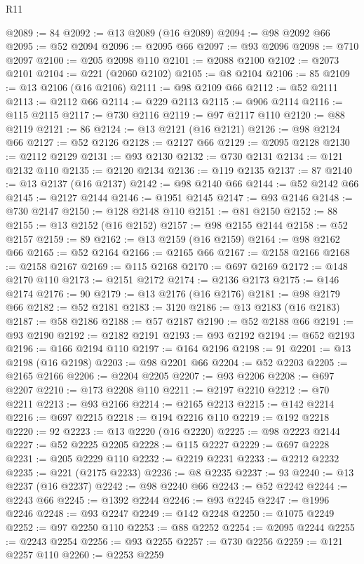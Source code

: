\begin{lexlean}{R11}
\begin{coremodule}
@2089 := 84
@2092 := @13 @2089 (@16 @2089)
@2094 := @98 @2092 @66
@2095 := @52 @2094
@2096 := @2095 @66
@2097 := @93 @2096
@2098 := @710 @2097
@2100 := @205 @2098 @110
@2101 := @2088 @2100
@2102 := @2073 @2101
@2104 := @221 (@2060 @2102)
@2105 := @8 @2104
@2106 := 85
@2109 := @13 @2106 (@16 @2106)
@2111 := @98 @2109 @66
@2112 := @52 @2111
@2113 := @2112 @66
@2114 := @229 @2113
@2115 := @906 @2114
@2116 := @115 @2115
@2117 := @730 @2116
@2119 := @97 @2117 @110
@2120 := @88 @2119
@2121 := 86
@2124 := @13 @2121 (@16 @2121)
@2126 := @98 @2124 @66
@2127 := @52 @2126
@2128 := @2127 @66
@2129 := @2095 @2128
@2130 := @2112 @2129
@2131 := @93 @2130
@2132 := @730 @2131
@2134 := @121 @2132 @110
@2135 := @2120 @2134
@2136 := @119 @2135
@2137 := 87
@2140 := @13 @2137 (@16 @2137)
@2142 := @98 @2140 @66
@2144 := @52 @2142 @66
@2145 := @2127 @2144
@2146 := @1951 @2145
@2147 := @93 @2146
@2148 := @730 @2147
@2150 := @128 @2148 @110
@2151 := @81 @2150
@2152 := 88
@2155 := @13 @2152 (@16 @2152)
@2157 := @98 @2155 @2144
@2158 := @52 @2157
@2159 := 89
@2162 := @13 @2159 (@16 @2159)
@2164 := @98 @2162 @66
@2165 := @52 @2164
@2166 := @2165 @66
@2167 := @2158 @2166
@2168 := @2158 @2167
@2169 := @115 @2168
@2170 := @697 @2169
@2172 := @148 @2170 @110
@2173 := @2151 @2172
@2174 := @2136 @2173
@2175 := @146 @2174
@2176 := 90
@2179 := @13 @2176 (@16 @2176)
@2181 := @98 @2179 @66
@2182 := @52 @2181
@2183 := 3120
@2186 := @13 @2183 (@16 @2183)
@2187 := @58 @2186
@2188 := @57 @2187
@2190 := @52 @2188 @66
@2191 := @93 @2190
@2192 := @2182 @2191
@2193 := @93 @2192
@2194 := @652 @2193
@2196 := @166 @2194 @110
@2197 := @164 @2196
@2198 := 91
@2201 := @13 @2198 (@16 @2198)
@2203 := @98 @2201 @66
@2204 := @52 @2203
@2205 := @2165 @2166
@2206 := @2204 @2205
@2207 := @93 @2206
@2208 := @697 @2207
@2210 := @173 @2208 @110
@2211 := @2197 @2210
@2212 := @70 @2211
@2213 := @93 @2166
@2214 := @2165 @2213
@2215 := @142 @2214
@2216 := @697 @2215
@2218 := @194 @2216 @110
@2219 := @192 @2218
@2220 := 92
@2223 := @13 @2220 (@16 @2220)
@2225 := @98 @2223 @2144
@2227 := @52 @2225 @2205
@2228 := @115 @2227
@2229 := @697 @2228
@2231 := @205 @2229 @110
@2232 := @2219 @2231
@2233 := @2212 @2232
@2235 := @221 (@2175 @2233)
@2236 := @8 @2235
@2237 := 93
@2240 := @13 @2237 (@16 @2237)
@2242 := @98 @2240 @66
@2243 := @52 @2242
@2244 := @2243 @66
@2245 := @1392 @2244
@2246 := @93 @2245
@2247 := @1996 @2246
@2248 := @93 @2247
@2249 := @142 @2248
@2250 := @1075 @2249
@2252 := @97 @2250 @110
@2253 := @88 @2252
@2254 := @2095 @2244
@2255 := @2243 @2254
@2256 := @93 @2255
@2257 := @730 @2256
@2259 := @121 @2257 @110
@2260 := @2253 @2259

\end{coremodule}
\end{lexlean}
